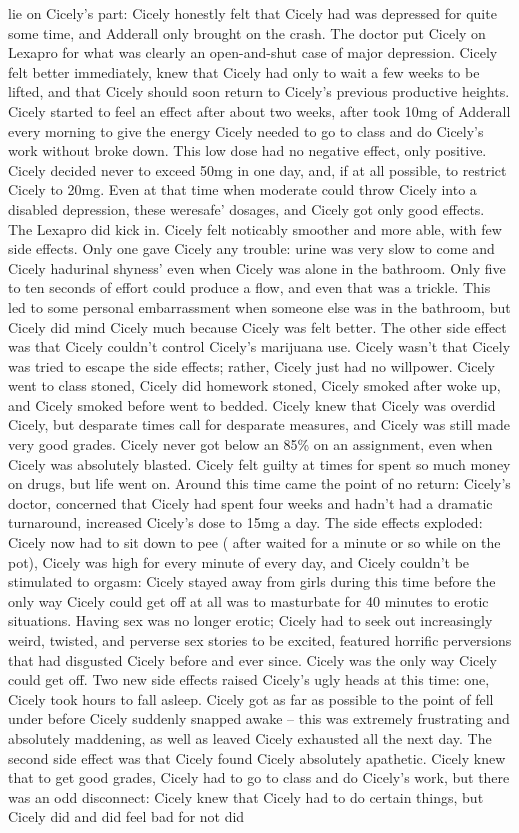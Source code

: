 \documentclass[12pt]{book}
\begin{document}
lie on Cicely's part: Cicely honestly felt that Cicely had was depressed for quite some time, and Adderall only brought on the crash. The doctor put Cicely on Lexapro for what was clearly an open-and-shut case of major depression. Cicely felt better immediately, knew that Cicely had only to wait a few weeks to be lifted, and that Cicely should soon return to Cicely's previous productive heights. Cicely started to feel an effect after about two weeks, after took 10mg of Adderall every morning to give the energy Cicely needed to go to class and do Cicely's work without broke down. This low dose had no negative effect, only positive. Cicely decided never to exceed 50mg in one day, and, if at all possible, to restrict Cicely to 20mg. Even at that time when moderate could throw Cicely into a disabled depression, these weresafe' dosages, and Cicely got only good effects. The Lexapro did kick in. Cicely felt noticably smoother and more able, with few side effects. Only one gave Cicely any trouble: urine was very slow to come and Cicely hadurinal shyness' even when Cicely was alone in the bathroom. Only five to ten seconds of effort could produce a flow, and even that was a trickle. This led to some personal embarrassment when someone else was in the bathroom, but Cicely did mind Cicely much because Cicely was felt better. The other side effect was that Cicely couldn't control Cicely's marijuana use. Cicely wasn't that Cicely was tried to escape the side effects; rather, Cicely just had no willpower. Cicely went to class stoned, Cicely did homework stoned, Cicely smoked after woke up, and Cicely smoked before went to bedded. Cicely knew that Cicely was overdid Cicely, but desparate times call for desparate measures, and Cicely was still made very good grades. Cicely never got below an 85\% on an assignment, even when Cicely was absolutely blasted. Cicely felt guilty at times for spent so much money on drugs, but life went on. Around this time came the point of no return: Cicely's doctor, concerned that Cicely had spent four weeks and hadn't had a dramatic turnaround, increased Cicely's dose to 15mg a day. The side effects exploded: Cicely now had to sit down to pee ( after waited for a minute or so while on the pot), Cicely was high for every minute of every day, and Cicely couldn't be stimulated to orgasm: Cicely stayed away from girls during this time before the only way Cicely could get off at all was to masturbate for 40 minutes to erotic situations. Having sex was no longer erotic; Cicely had to seek out increasingly weird, twisted, and perverse sex stories to be excited, featured horrific perversions that had disgusted Cicely before and ever since. Cicely was the only way Cicely could get off. Two new side effects raised Cicely's ugly heads at this time: one, Cicely took hours to fall asleep. Cicely got as far as possible to the point of fell under before Cicely suddenly snapped awake -- this was extremely frustrating and absolutely maddening, as well as leaved Cicely exhausted all the next day. The second side effect was that Cicely found Cicely absolutely apathetic. Cicely knew that to get good grades, Cicely had to go to class and do Cicely's work, but there was an odd disconnect: Cicely knew that Cicely had to do certain things, but Cicely did and did feel bad for not did 
\end{document}
